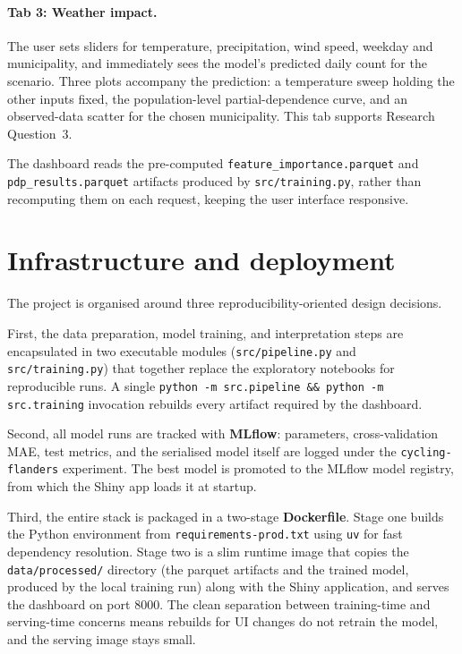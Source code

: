 \documentclass[11pt,a4paper]{article}
\begin{document}
\paragraph{Tab 3: Weather impact.}
The user sets sliders for temperature, precipitation, wind speed,
weekday and municipality, and immediately sees the model's predicted
daily count for the scenario. Three plots accompany the prediction: a
temperature sweep holding the other inputs fixed, the population-level
partial-dependence curve, and an observed-data scatter for the chosen
municipality. This tab supports Research Question~3.

The dashboard reads the pre-computed \texttt{feature\_importance.parquet}
and \texttt{pdp\_results.parquet} artifacts produced by
\texttt{src/training.py}, rather than recomputing them on each request,
keeping the user interface responsive.

\section{Infrastructure and deployment}
\label{sec:infra}

The project is organised around three reproducibility-oriented design
decisions.

First, the data preparation, model training, and interpretation steps
are encapsulated in two executable modules (\texttt{src/pipeline.py}
and \texttt{src/training.py}) that together replace the exploratory
notebooks for reproducible runs. A single
\texttt{python -m src.pipeline \&\& python -m src.training} invocation
rebuilds every artifact required by the dashboard.

Second, all model runs are tracked with \textbf{MLflow}: parameters,
cross-validation MAE, test metrics, and the serialised model itself
are logged under the \texttt{cycling-flanders} experiment. The best
model is promoted to the MLflow model registry, from which the Shiny
app loads it at startup.

Third, the entire stack is packaged in a two-stage \textbf{Dockerfile}.
Stage one builds the Python environment from
\texttt{requirements-prod.txt} using \texttt{uv} for fast dependency
resolution. Stage two is a slim runtime image that copies the
\texttt{data/processed/} directory (the parquet artifacts and the
trained model, produced by the local training run) along with the
Shiny application, and serves the dashboard on port 8000. The clean
separation between training-time and serving-time concerns means
rebuilds for UI changes do not retrain the model, and the serving
image stays small.
\end{document}
